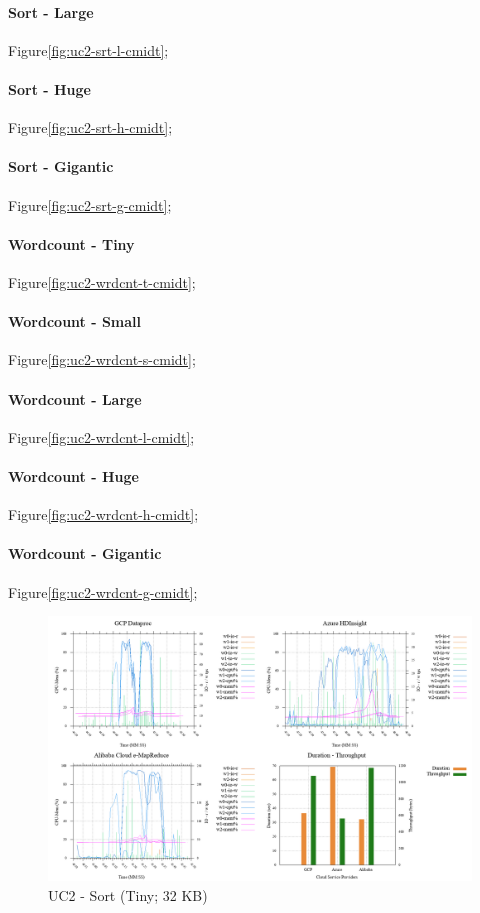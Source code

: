 \documentclass[review]{elsarticle}
\begin{document}
\paragraph{Sort - Large} Figure\ref{fig:uc2-srt-l-cmidt}; 
\paragraph{Sort - Huge} Figure\ref{fig:uc2-srt-h-cmidt}; 
\paragraph{Sort - Gigantic} Figure\ref{fig:uc2-srt-g-cmidt}; 



\paragraph{Wordcount - Tiny} Figure\ref{fig:uc2-wrdcnt-t-cmidt}; 
\paragraph{Wordcount - Small} Figure\ref{fig:uc2-wrdcnt-s-cmidt}; 
\paragraph{Wordcount - Large} Figure\ref{fig:uc2-wrdcnt-l-cmidt}; 
\paragraph{Wordcount - Huge} Figure\ref{fig:uc2-wrdcnt-h-cmidt}; 
\paragraph{Wordcount - Gigantic} Figure\ref{fig:uc2-wrdcnt-g-cmidt}; 


\begin{figure}[b]
	\caption{UC2 - Sort (Tiny; 32 KB)}
	\label{fig:uc2-srt-t-cmidt}
	\includegraphics[width=\textwidth]{uc2-srt-t-cmidt}
	\centering
\end{figure}
\end{document}
